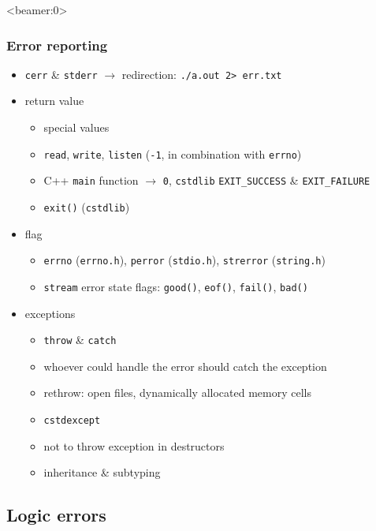 \begin{frame}<beamer:0>
    \frametitle{Error reporting}
    \begin{itemize}[<+->]
        \item \texttt{cerr} \& \texttt{stderr} \onslide<+-> $\longrightarrow$ redirection: \texttt{./a.out 2> err.txt}
        \item return value
        \begin{itemize}[<+->]
            \item special values
            \item \texttt{read}, \texttt{write}, \texttt{listen} (\texttt{-1}, in combination with \texttt{errno})
            \item C++ \texttt{main} function \onslide<+-> $\longrightarrow$ \texttt{0}\onslide<+->, \texttt{cstdlib} \texttt{EXIT\_SUCCESS} \& \texttt{EXIT\_FAILURE}
            \item \texttt{exit()} (\texttt{cstdlib})
        \end{itemize}
        \item flag
        \begin{itemize}[<+->]
            \item \texttt{errno} (\texttt{errno.h})\onslide<+->, \texttt{perror} (\texttt{stdio.h})\onslide<+->, \texttt{strerror} (\texttt{string.h})
            \item \texttt{stream} error state flags\onslide<+->: \texttt{good()}\onslide<+->, \texttt{eof()}\onslide<+->, \texttt{fail()}\onslide<+->, \texttt{bad()}
        \end{itemize}
        \item exceptions
        \begin{itemize}[<+->]
            \item \texttt{throw} \& \texttt{catch}
            \item whoever could handle the error should catch the exception
            \item rethrow\onslide<+->: open files\onslide<+->, dynamically allocated memory cells
            \item \texttt{cstdexcept}
            \item not to throw exception in destructors
            \item inheritance \& subtyping
        \end{itemize}
    \end{itemize}
\end{frame}

\subsection<beamer:0>{Logic errors}

